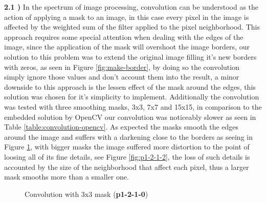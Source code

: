 \documentclass[12pt,a4paper]{article}
\begin{document}
\textbf{2.1 )} In the spectrum of image processing, convolution can be understood as the action of applying a mask to an image, in this case every pixel in the image is affected by the weighted sum of the filter applied to the pixel neighborhood. This approach requires some special attention when dealing with the edges of the image, since the application of the mask will overshoot the image borders, our solution to this problem was to extend the original image filling it's new borders with zeros, as seen in Figure \ref{fig:make-border}, by doing so the convolution simply ignore those values and don't account them into the result, a minor downside to this approach is the lessen effect of the mask around the edges, this solution was chosen for it's simplicity to implement. Additionally the convolution was tested with three smoothing masks, 3x3, 7x7 and 15x15, in comparison to the embedded solution by OpenCV our convolution was noticeably slower as seen in Table \ref{table:convolution-opencv}. As expected the masks smooth the edges around the image and suffers with a darkening close to the borders as seeing in Figure \ref{fig:p1-2-1-0}, with bigger masks the image suffered more distortion to the point of loosing all of its fine details, see Figure \ref{fig:p1-2-1-2}, the loss of such details is accounted by the size of the neighborhood that affect each pixel, thus a larger mask smooths more than a smaller one.\\

\begin{figure}[!h]
	\centering
	{%
		\setlength{\fboxsep}{1pt}%
		\setlength{\fboxrule}{1pt}%
	}%
	\caption{Convolution with 3x3 mask (\textbf{p1-2-1-0})}
	\label{fig:p1-2-1-0}
\end{figure}
\end{document}
